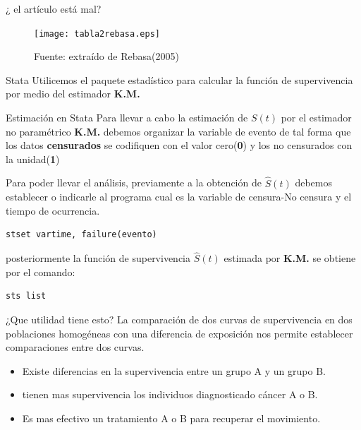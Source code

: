 \documentclass{beamer}
\begin{document}
\begin{frame}{ ¿ el artículo está mal?}

\begin{figure}
  \centering
    \texttt{[image: tabla2rebasa.eps]}
  \caption{Fuente: extraído de Rebasa(2005)}
  \label{Tabla 2 (del documento)}
\end{figure}

\end{frame}



\begin{frame}{Stata}
Utilicemos el paquete estadístico para calcular la función de supervivencia por medio del estimador \textbf{K.M.}
\end{frame}



\begin{frame}{Estimación en Stata}
Para llevar a cabo la estimación de $S(t)$ por el estimador no paramétrico  \textbf{K.M.} debemos organizar la variable de evento  de tal forma que los datos \textbf{censurados} se codifiquen con el valor cero(\textbf{0})  y los no censurados con la unidad(\textbf{1})
\end{frame}


\begin{frame}[fragile=singleslide]
Para  poder llevar el análisis, previamente a la obtención de $\hat{S}(t)$ debemos establecer o indicarle al programa cual es la variable de censura-No censura y el tiempo de ocurrencia.
\begin{verbatim}
stset vartime, failure(evento)

\end{verbatim}
 posteriormente la función de supervivencia $\hat{S}(t)$ estimada por \textbf{K.M.}  se obtiene por el comando:


\begin{verbatim}
sts list 

\end{verbatim}
\end{frame}


\begin{frame}{¿Que utilidad tiene esto?}
La comparación de dos curvas de supervivencia en dos poblaciones homogéneas con una diferencia de exposición nos permite establecer comparaciones entre dos curvas.

\begin{itemize}

\item Existe diferencias en la supervivencia entre un grupo A y un grupo B.

\item tienen mas supervivencia los individuos diagnosticado  cáncer A o B.

\item Es mas efectivo un tratamiento A o B para recuperar el movimiento.
\end{itemize}

\end{frame}
\end{document}
